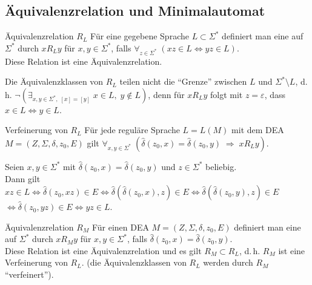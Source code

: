 \subsection{%
    Äquivalenzrelation und Minimalautomat%
}

\begin{Def}{Äquivalenzrelation $R_L$}
    Für eine gegebene Sprache $L \subset \Sigma^\ast$ definiert man eine
     auf $\Sigma^\ast$ durch
    $x R_L y$ für $x, y \in \Sigma^\ast$, falls
    $\forall_{z \in \Sigma^\ast}\; (xz \in L \iff yz \in L)$.\\
    Diese Relation ist eine Äquivalenzrelation.
\end{Def}

\begin{Bem}
    Die Äquivalenzklassen von $R_L$ teilen nicht die "`Grenze"' zwischen $L$
    und $\Sigma^\ast \setminus L$, d.\,h.
    $\lnot (\exists_{x, y \in \Sigma^\ast,\; [x] = [y]}\; x \in L,\;
    y \notin L)$,
    denn für $x R_L y$ folgt mit $z = \varepsilon$,
    dass $x \in L \iff y \in L$.
\end{Bem}

\begin{Lemma}{Verfeinerung von $R_L$}
    Für jede reguläre Sprache $L = L(M)$ mit dem DEA\\
    $M = (Z, \Sigma, \delta, z_0, E)$ gilt
    $\forall_{x, y \in \Sigma^\ast}\;
    (\widehat{\delta}(z_0, x) = \widehat{\delta}(z_0, y)
    \;\Rightarrow\; x R_L y)$.
\end{Lemma}

\begin{Beweis}
    Seien $x, y \in \Sigma^\ast$ mit
    $\widehat{\delta}(z_0, x) = \widehat{\delta}(z_0, y)$ und
    $z \in \Sigma^\ast$ beliebig.\\
    Dann gilt $xz \in L
    \iff \widehat{\delta}(z_0, xz) \in E
    \iff \widehat{\delta}(\widehat{\delta}(z_0, x), z) \in E
    \iff \widehat{\delta}(\widehat{\delta}(z_0, y), z) \in E$\\
    $\iff \widehat{\delta}(z_0, yz) \in E
    \iff yz \in L$.
\end{Beweis}

\begin{Def}{Äquivalenzrelation $R_M$}
    Für einen DEA $M = (Z, \Sigma, \delta, z_0, E)$ definiert man eine
     auf $\Sigma^\ast$ durch
    $x R_M y$ für $x, y \in \Sigma^\ast$, falls
    $\widehat{\delta}(z_0, x) = \widehat{\delta}(z_0, y)$.\\
    Diese Relation ist eine Äquivalenzrelation und es gilt $R_M \subset R_L$,
    d.\,h. $R_M$ ist eine Verfeinerung von $R_L$.
    (die Äquivalenzklassen von $R_L$ werden durch $R_M$ "`verfeinert"').
\end{Def}

